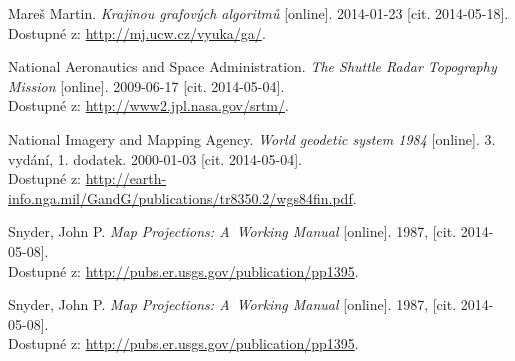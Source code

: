 \begin{thebibliography}{99}
	{\sc Mareš} Martin.
	\emph{Krajinou grafových algoritmů} [online]. 
	2014-01-23 [cit. 2014-05-18]. \\
	Dostupné z:	\url{http://mj.ucw.cz/vyuka/ga/}.

	{\sc National Aeronautics and Space Administration.}
	\emph{The Shuttle Radar Topography Mission} [online]. 
	2009-06-17 [cit. 2014-05-04]. \\
	Dostupné z: \url{http://www2.jpl.nasa.gov/srtm/}.

	{\sc National Imagery and Mapping Agency.}
	\emph{World geodetic system 1984} [online]. 
	3. vydání, 1. dodatek.
	2000-01-03 [cit. 2014-05-04]. \\
	Dostupné z: \url{http://earth-info.nga.mil/GandG/publications/tr8350.2/wgs84fin.pdf}.

	{\sc Snyder,} John P.
	\emph{Map Projections: A~Working Manual} [online]. 
	1987, [cit. 2014-05-08]. \\
	Dostupné z: \url{http://pubs.er.usgs.gov/publication/pp1395}.

	{\sc Snyder,} John P.
	\emph{Map Projections: A~Working Manual} [online]. 
	1987, [cit. 2014-05-08]. \\
	Dostupné z: \url{http://pubs.er.usgs.gov/publication/pp1395}.


	

\end{thebibliography}
